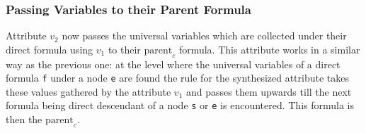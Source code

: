 \subsubsection*{Passing Variables to their Parent Formula}
Attribute $v_2$ now passes  the universal variables which are collected under their direct formula using  $v_1$ to their $\text{parent}_c$ formula.
This attribute works in a similar way as the previous one:
at the level where the universal variables of a direct formula \texttt{f} under a node \texttt{e} are found the rule for the synthesized attribute 
takes these values gathered by the attribute $v_1$ and 
passes them upwards till the next formula being 
direct descendant of a node \texttt{s} or \texttt{e} is encountered. This formula is then the $\text{parent}_c$.
%
%
% 

